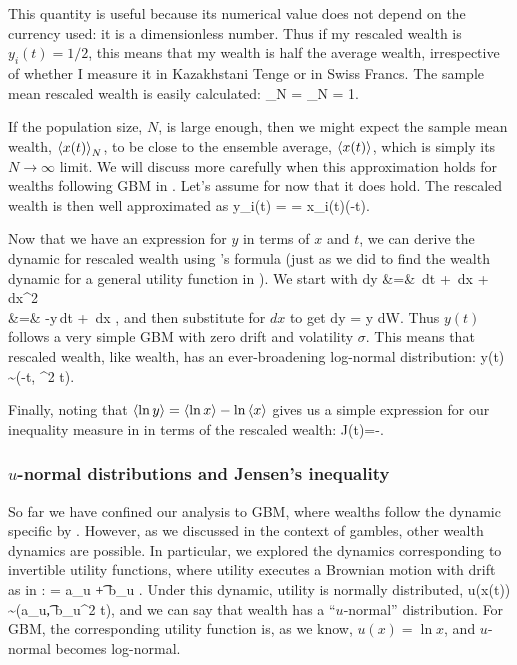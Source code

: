 This quantity is useful because its numerical value does not 
depend on the currency used: it is a dimensionless number. 
Thus if my rescaled wealth is $y_i(t) = 1/2$, this means that my wealth is half the 
average wealth, irrespective of whether I measure it in Kazakhstani Tenge 
or in Swiss Francs. The sample mean rescaled wealth is easily calculated:
\be
{}_N = _N = 1.
\ee

If the population size, $N$, is large enough, then we might expect the sample mean wealth, $\left\langle x(t) \right\rangle_N$, to be close to the ensemble average, $\left\langle x(t) \right\rangle$, which is simply its $N\to\infty$ limit. We will discuss more carefully when this approximation holds for wealths following GBM in . Let's assume for now that it does hold. The rescaled wealth is then well approximated as
\be
y_i(t) =  = x_i(t)\exp(-\mu t).
\ee

Now that we have an expression for $y$ in terms of $x$ and $t$, we can derive the dynamic for rescaled wealth using \Ito's formula (just as we did to find the wealth dynamic for a general utility function in ). We start with
\bea
dy &=& \,dt + \,dx +   \,dx^2 \\
&=& -\mu y\,dt + \,dx ,
\eea
and then substitute  for $dx$ to get
\be
dy = y \sigma dW.
\ee
Thus $y(t)$ follows a very simple GBM with zero drift and volatility $\sigma$. This means that rescaled wealth, like wealth, has an ever-broadening log-normal distribution:
\be
\ln y(t) \sim {}\left(-t, \sigma^2 t\right).
\ee

Finally, noting that $\left\langle\ln y \right\rangle=\left\langle\ln x \right\rangle-\ln\left\langle x \right\rangle$ gives us a simple expression for our inequality measure in  in terms of the rescaled wealth:
\be
J(t)=-.
\ee


\subsubsection{$u$-normal distributions and Jensen's inequality}
So far we have confined our analysis to GBM, where wealths follow the dynamic specific by . However, as we discussed in the context of gambles, other wealth dynamics are possible. In particular, we explored the dynamics corresponding to invertible utility functions, where utility executes a Brownian motion with drift as in :
\be
\gd\gu = a_u \gd\t + b_u \gd\gW.
\ee
Under this dynamic, utility is normally distributed,
\be
u(x(t)) \sim {}\left(a_u\t, {b_u}^2 t\right),
\ee
and we can say that wealth has a ``$u$-normal'' distribution. For GBM, the corresponding utility function is, as we know, $u(x)=\ln x$, and $u$-normal becomes log-normal.

